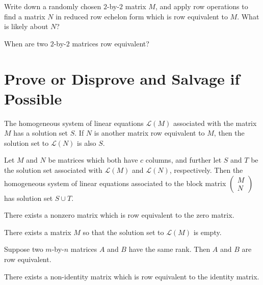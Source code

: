 \documentclass{homework}
\begin{document}
\begin{problem}
  Write down a randomly chosen $2$-by-$2$ matrix $M$, and apply row
  operations to find a matrix $N$ in reduced row echelon form which is row
  equivalent to $M$.  What is likely about $N$?
\end{problem}

\begin{problem}
  When are two $2$-by-$2$ matrices row equivalent?
\end{problem}

\section{Prove or Disprove and Salvage if Possible}

\begin{problem}
  The homogeneous system of linear equations $\mathcal{L}(M)$
  associated with the matrix $M$ has a solution set $S$.  If $N$ is
  another matrix row equivalent to $M$, then the solution set to
  $\mathcal{L}(N)$ is also $S$.
\end{problem}

\begin{problem}
  Let $M$ and $N$ be matrices which both have $c$ columns, and further
  let $S$ and $T$ be the solution set associated with $\mathcal{L}(M)$
  and $\mathcal{L}(N)$, respectively.  Then the homogeneous system of
  linear equations associated to the block matrix $\begin{pmatrix} M \\
    N \end{pmatrix}$ has solution set $S \cup T$.
\end{problem}

\begin{problem}
  There exists a nonzero matrix which is row equivalent to the zero matrix.
\end{problem}

\begin{problem}
  There exists a matrix $M$ so that the solution set to $\mathcal{L}(M)$ is empty.
\end{problem}

\begin{problem}
  Suppose two $m$-by-$n$ matrices $A$ and $B$ have the same rank.
  Then $A$ and $B$ are row equivalent.
\end{problem}

\begin{problem}
  There exists a non-identity matrix which is row equivalent to the identity
  matrix.
\end{problem}
\end{document}

